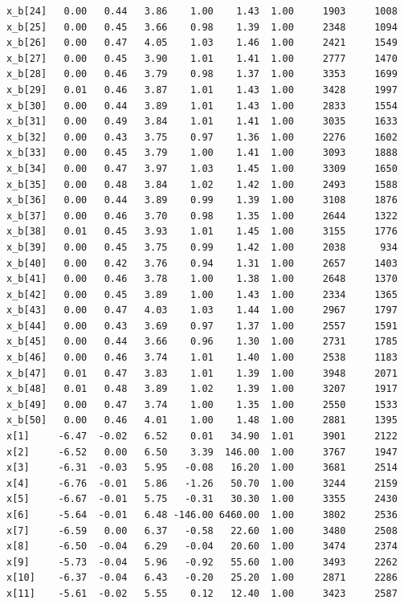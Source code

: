 \documentclass[american,]{article}
\begin{document}
\begin{verbatim}
x_b[24]   0.00   0.44   3.86    1.00    1.43  1.00     1903     1008
x_b[25]   0.00   0.45   3.66    0.98    1.39  1.00     2348     1094
x_b[26]   0.00   0.47   4.05    1.03    1.46  1.00     2421     1549
x_b[27]   0.00   0.45   3.90    1.01    1.41  1.00     2777     1470
x_b[28]   0.00   0.46   3.79    0.98    1.37  1.00     3353     1699
x_b[29]   0.01   0.46   3.87    1.01    1.43  1.00     3428     1997
x_b[30]   0.00   0.44   3.89    1.01    1.43  1.00     2833     1554
x_b[31]   0.00   0.49   3.84    1.01    1.41  1.00     3035     1633
x_b[32]   0.00   0.43   3.75    0.97    1.36  1.00     2276     1602
x_b[33]   0.00   0.45   3.79    1.00    1.41  1.00     3093     1888
x_b[34]   0.00   0.47   3.97    1.03    1.45  1.00     3309     1650
x_b[35]   0.00   0.48   3.84    1.02    1.42  1.00     2493     1588
x_b[36]   0.00   0.44   3.89    0.99    1.39  1.00     3108     1876
x_b[37]   0.00   0.46   3.70    0.98    1.35  1.00     2644     1322
x_b[38]   0.01   0.45   3.93    1.01    1.45  1.00     3155     1776
x_b[39]   0.00   0.45   3.75    0.99    1.42  1.00     2038      934
x_b[40]   0.00   0.42   3.76    0.94    1.31  1.00     2657     1403
x_b[41]   0.00   0.46   3.78    1.00    1.38  1.00     2648     1370
x_b[42]   0.00   0.45   3.89    1.00    1.43  1.00     2334     1365
x_b[43]   0.00   0.47   4.03    1.03    1.44  1.00     2967     1797
x_b[44]   0.00   0.43   3.69    0.97    1.37  1.00     2557     1591
x_b[45]   0.00   0.44   3.66    0.96    1.30  1.00     2731     1785
x_b[46]   0.00   0.46   3.74    1.01    1.40  1.00     2538     1183
x_b[47]   0.01   0.47   3.83    1.01    1.39  1.00     3948     2071
x_b[48]   0.01   0.48   3.89    1.02    1.39  1.00     3207     1917
x_b[49]   0.00   0.47   3.74    1.00    1.35  1.00     2550     1533
x_b[50]   0.00   0.46   4.01    1.00    1.48  1.00     2881     1395
x[1]     -6.47  -0.02   6.52    0.01   34.90  1.01     3901     2122
x[2]     -6.52   0.00   6.50    3.39  146.00  1.00     3767     1947
x[3]     -6.31  -0.03   5.95   -0.08   16.20  1.00     3681     2514
x[4]     -6.76  -0.01   5.86   -1.26   50.70  1.00     3244     2159
x[5]     -6.67  -0.01   5.75   -0.31   30.30  1.00     3355     2430
x[6]     -5.64  -0.01   6.48 -146.00 6460.00  1.00     3802     2536
x[7]     -6.59   0.00   6.37   -0.58   22.60  1.00     3480     2508
x[8]     -6.50  -0.04   6.29   -0.04   20.60  1.00     3474     2374
x[9]     -5.73  -0.04   5.96   -0.92   55.60  1.00     3493     2262
x[10]    -6.37  -0.04   6.43   -0.20   25.20  1.00     2871     2286
x[11]    -5.61  -0.02   5.55    0.12   12.40  1.00     3423     2587

\end{verbatim}
\end{document}
